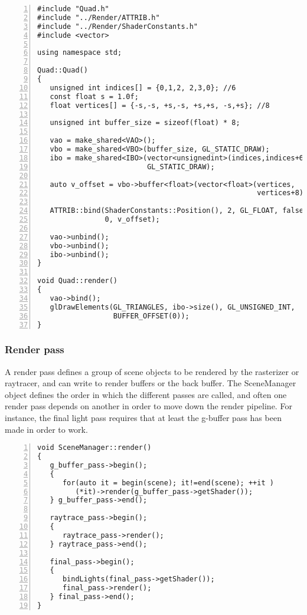 \begin{Verbatim}[frame=single, numbers=left, label=Fullscreen quad implementation]
#include "Quad.h"
#include "../Render/ATTRIB.h"
#include "../Render/ShaderConstants.h"
#include <vector>

using namespace std;

Quad::Quad()
{
   unsigned int indices[] = {0,1,2, 2,3,0}; //6
   const float s = 1.0f;
   float vertices[] = {-s,-s, +s,-s, +s,+s, -s,+s}; //8

   unsigned int buffer_size = sizeof(float) * 8;

   vao = make_shared<VAO>();
   vbo = make_shared<VBO>(buffer_size, GL_STATIC_DRAW);
   ibo = make_shared<IBO>(vector<unsignedint>(indices,indices+6),
                          GL_STATIC_DRAW);

   auto v_offset = vbo->buffer<float>(vector<float>(vertices, 
                                                    vertices+8));

   ATTRIB::bind(ShaderConstants::Position(), 2, GL_FLOAT, false, 
                0, v_offset);

   vao->unbind();
   vbo->unbind();
   ibo->unbind();
}

void Quad::render()
{
   vao->bind();
   glDrawElements(GL_TRIANGLES, ibo->size(), GL_UNSIGNED_INT, 
                  BUFFER_OFFSET(0));
}
\end{Verbatim}

\subsubsection{Render pass}
A render pass defines a group of scene objects to be rendered by the rasterizer or raytracer, and can write to render buffers or the back buffer. The SceneManager object defines the order in which the different passes are called, and often one render pass depends on another in order to move down the render pipeline. For instance, the final light pass requires that at least the g-buffer pass has been made in order to work.

\begin{Verbatim}[frame=single, numbers=left, label=Scene Manager's render implementation]
void SceneManager::render()
{
   g_buffer_pass->begin();
   {
      for(auto it = begin(scene); it!=end(scene); ++it )
         (*it)->render(g_buffer_pass->getShader());
   } g_buffer_pass->end();

   raytrace_pass->begin();
   {
      raytrace_pass->render();
   } raytrace_pass->end();

   final_pass->begin();
   {
      bindLights(final_pass->getShader());
      final_pass->render();
   } final_pass->end();
}
\end{Verbatim}


